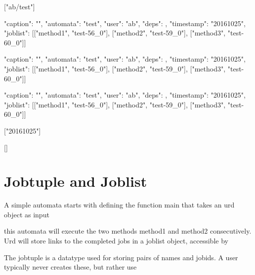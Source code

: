\begin{shell}
["ab/test"]

{"caption": "", "automata": "test", "user": "ab", "deps": {},
  "timestamp": "20161025", "joblist": [["method1", "test-56_0"],
  ["method2", "test-59_0"], ["method3", "test-60_0"]]}

{"caption": "", "automata": "test", "user": "ab", "deps": {},
  "timestamp": "20161025", "joblist": [["method1", "test-56_0"],
  ["method2", "test-59_0"], ["method3", "test-60_0"]]}

{"caption": "", "automata": "test", "user": "ab", "deps": {},
  "timestamp": "20161025", "joblist": [["method1", "test-56_0"],
  ["method2", "test-59_0"], ["method3", "test-60_0"]]}

["20161025"]

[]                                 
\end{shell}












\section{Jobtuple and Joblist}

A simple automata starts with defining the function main that takes an
urd object as input

this automata will execute the two methods method1 and method2
consecutively.  Urd will store links to the completed jobs in a
joblist object, accessible by




The jobtuple is a datatype used for storing pairs of names and jobids.
A user typically never creates these, but rather use
\begin{python}

\end{python}


